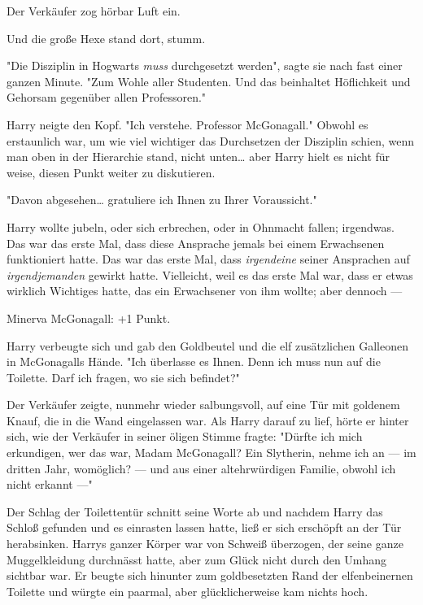 {Der Verkäufer zog hörbar Luft ein.

Und die große Hexe stand dort, stumm.

"Die Disziplin in Hogwarts \emph{muss} durchgesetzt werden", sagte sie nach fast einer ganzen Minute. "Zum Wohle aller Studenten. Und das beinhaltet Höflichkeit und Gehorsam gegenüber allen Professoren."

Harry neigte den Kopf. "Ich verstehe. Professor McGonagall." Obwohl es erstaunlich war, um wie viel wichtiger das Durchsetzen der Disziplin schien, wenn man oben in der Hierarchie stand, nicht unten… aber Harry hielt es nicht für weise, diesen Punkt weiter zu diskutieren.

"Davon abgesehen… gratuliere ich Ihnen zu Ihrer Voraussicht."

Harry wollte jubeln, oder sich erbrechen, oder in Ohnmacht fallen; irgendwas. Das war das erste Mal, dass diese Ansprache jemals bei einem Erwachsenen funktioniert hatte. Das war das erste Mal, dass \emph{irgendeine} seiner Ansprachen auf \emph{irgendjemanden} gewirkt hatte. Vielleicht, weil es das erste Mal war, dass er etwas wirklich Wichtiges hatte, das ein Erwachsener von ihm wollte; aber dennoch ---

Minerva McGonagall: +1 Punkt.

Harry verbeugte sich und gab den Goldbeutel und die elf zusätzlichen Galleonen in McGonagalls Hände. "Ich überlasse es Ihnen. Denn ich muss nun auf die Toilette. Darf ich fragen, wo sie sich befindet?"

Der Verkäufer zeigte, nunmehr wieder salbungsvoll, auf eine Tür mit goldenem Knauf, die in die Wand eingelassen war. Als Harry darauf zu lief, hörte er hinter sich, wie der Verkäufer in seiner öligen Stimme fragte: "Dürfte ich mich erkundigen, wer das war, Madam McGonagall? Ein Slytherin, nehme ich an --- im dritten Jahr, womöglich? --- und aus einer altehrwürdigen Familie, obwohl ich nicht erkannt ---"

Der Schlag der Toilettentür schnitt seine Worte ab und nachdem Harry das Schloß gefunden und es einrasten lassen hatte, ließ er sich erschöpft an der Tür herabsinken. Harrys ganzer Körper war von Schweiß überzogen, der seine ganze Muggelkleidung durchnässt hatte, aber zum Glück nicht durch den Umhang sichtbar war. Er beugte sich hinunter zum goldbesetzten Rand der elfenbeinernen Toilette und würgte ein paarmal, aber glücklicherweise kam nichts hoch.

\later

}
